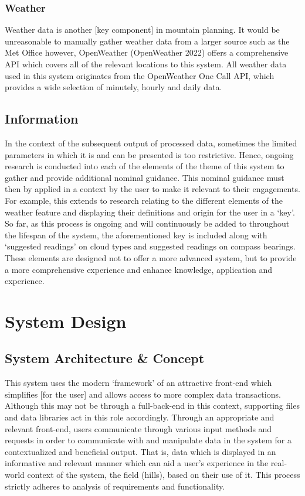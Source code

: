 \documentclass[11pt, english]{article}
\begin{document}
		\subsubsection{Weather}

	Weather data is another [key component] in mountain planning. It would be unreasonable to manually gather weather data from a larger source such as the Met Office however, OpenWeather (OpenWeather 2022) offers a comprehensive API which covers all of the relevant locations to this system. All weather data used in this system originates from the OpenWeather One Call API, which provides a wide selection of minutely, hourly and daily data.

	\subsection{Information}

	In the context of the subsequent output of processed data, sometimes the limited parameters in which it is and can be presented is too restrictive. Hence, ongoing research is conducted into each of the elements of the theme of this system to gather and provide additional nominal guidance. This nominal guidance must then by applied in a context by the user to make it relevant to their engagements. For example, this extends to research relating to the different elements of the weather feature and displaying their definitions and origin for the user in a `key'. So far, as this process is ongoing and will continuously be added to throughout the lifespan of the system, the aforementioned key is included along with `suggested readings' on cloud types and suggested readings on compass bearings. These elements are designed not to offer a more advanced system, but to provide a more comprehensive experience and enhance knowledge, application and experience.

\newpage

\section{System Design}\label{ch5}

	\subsection{System Architecture \& Concept}

	This system uses the modern `framework' of an attractive front-end which simplifies [for the user] and allows access to more complex data transactions. Although this may not be through a full-back-end in this context, supporting files and data libraries act in this role accordingly. Through an appropriate and relevant front-end, users communicate through various input methods and requests in order to communicate with and manipulate data in the system for a contextualized and beneficial output. That is, data which is displayed in an informative and relevant manner which can aid a user's experience in the real-world context of the system, the field (hills), based on their use of it. This process strictly adheres to analysis of requirements and functionality.\\
\end{document}
